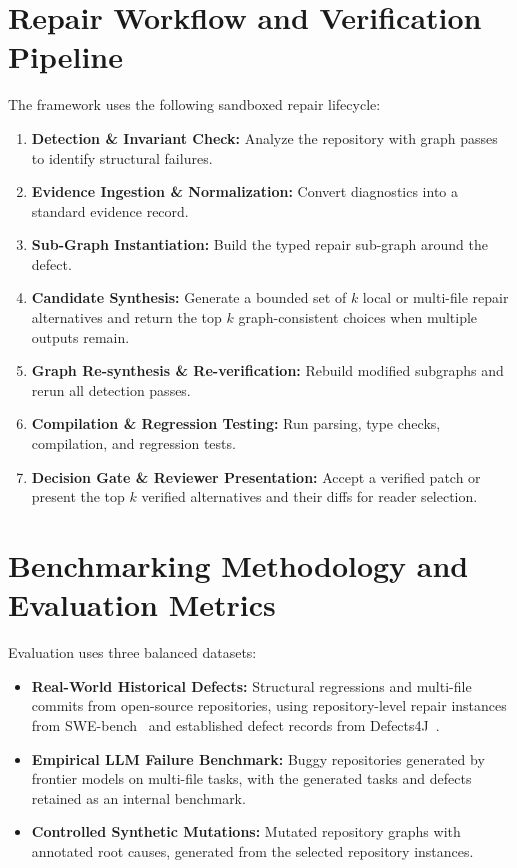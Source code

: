 \documentclass[10pt,a4paper]{article}
\begin{document}
\newpage

\fontsize{9.3}{11.2}\selectfont

\section{Repair Workflow and Verification Pipeline}
The framework uses the following sandboxed repair lifecycle:
\begin{enumerate}[leftmargin=1.4em]
  \item \textbf{Detection \& Invariant Check:} Analyze the repository with graph passes to identify structural failures.
  \item \textbf{Evidence Ingestion \& Normalization:} Convert diagnostics into a standard evidence record.
  \item \textbf{Sub-Graph Instantiation:} Build the typed repair sub-graph around the defect.
  \item \textbf{Candidate Synthesis:} Generate a bounded set of $k$ local or multi-file repair alternatives and return the top $k$ graph-consistent choices when multiple outputs remain.
  \item \textbf{Graph Re-synthesis \& Re-verification:} Rebuild modified subgraphs and rerun all detection passes.
  \item \textbf{Compilation \& Regression Testing:} Run parsing, type checks, compilation, and regression tests.
  \item \textbf{Decision Gate \& Reviewer Presentation:} Accept a verified patch or present the top $k$ verified alternatives and their diffs for reader selection.
\end{enumerate}

\section{Benchmarking Methodology and Evaluation Metrics}
Evaluation uses three balanced datasets:
\begin{itemize}
  \item \textbf{Real-World Historical Defects:} Structural regressions and multi-file commits from open-source repositories, using repository-level repair instances from SWE-bench~\cite{swebench} and established defect records from Defects4J~\cite{defects4j}.
  \item \textbf{Empirical LLM Failure Benchmark:} Buggy repositories generated by frontier models on multi-file tasks, with the generated tasks and defects retained as an internal benchmark.
  \item \textbf{Controlled Synthetic Mutations:} Mutated repository graphs with annotated root causes, generated from the selected repository instances.
\end{itemize}
\end{document}
